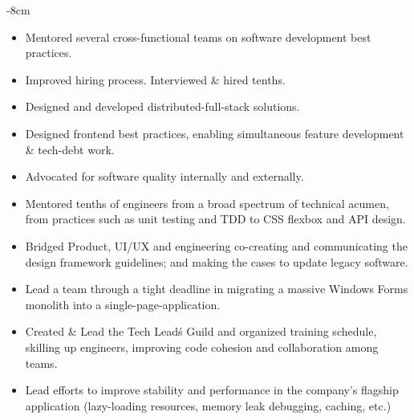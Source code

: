 \documentclass[10pt,a4paper]{altacv}
\begin{document}

\begin{adjustwidth}{}{-8cm}
\makecvheader
\end{adjustwidth}


\begin{itemize}
\item Mentored several cross-functional teams on software development best practices.
\item Improved hiring process. Interviewed \& hired tenths.
\item Designed and developed distributed-full-stack solutions.
\item Designed frontend best practices, enabling simultaneous feature development \& tech-debt work.
\item Advocated for software quality internally and externally.
\end{itemize}
\divider

\begin{itemize}
\item Mentored tenths of engineers from a broad spectrum of technical acumen, from practices such as unit testing and TDD to CSS flexbox and API design.
\item Bridged Product, UI/UX and engineering co-creating and communicating the design framework guidelines; and making the cases to update legacy software.
\item Lead a team through a tight deadline in migrating a massive Windows Forms monolith into a single-page-application.
\item Created \& Lead the Tech Lead\'s Guild and organized training schedule, skilling up engineers, improving code cohesion and collaboration among teams.
\item Lead efforts to improve stability and performance in the company's flagship application (lazy-loading resources, memory leak debugging, caching, etc.)
\end{itemize}
\divider
\end{document}
